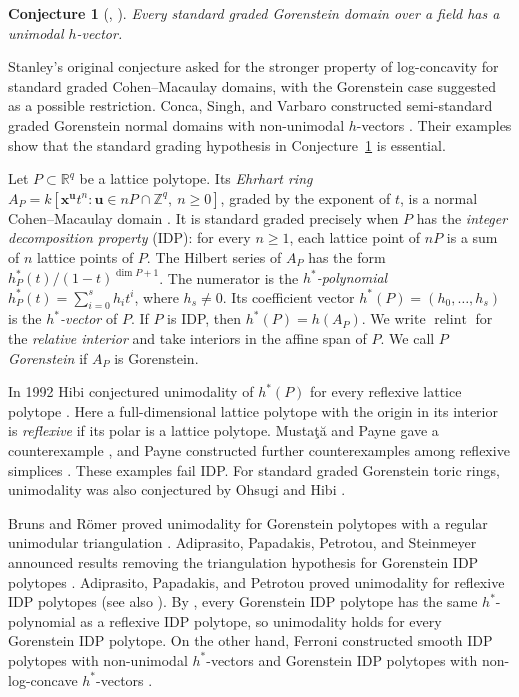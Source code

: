 \documentclass[a4paper,11pt]{amsart}
\DeclareMathOperator{\relint}{relint}
\newcommand{\kk}{k}
\newcommand{\ZZ}{\mathbb{Z}}
\newcommand{\RR}{\mathbb{R}}
\newtheorem{conjecture}[theorem]{Conjecture}
\theoremstyle{definition}
\begin{document}
\begin{conjecture}[{\cite[Conjecture~1.5]{H89}, \cite[Conjecture~4~(a), p.~512]{S89}}]\label{conj:classical}
Every standard graded Gorenstein domain over a field has a unimodal $h$-vector.
\end{conjecture}

Stanley's original conjecture asked for the stronger property of log-concavity for standard graded Cohen--Macaulay domains, with the Gorenstein case suggested as a possible restriction. Conca, Singh, and Varbaro constructed semi-standard graded Gorenstein normal domains with non-unimodal $h$-vectors \cite[Theorem~4.2]{CSV25}. Their examples show that the standard grading hypothesis in Conjecture~\ref{conj:classical} is essential.

Let $P\subset\RR^q$ be a lattice polytope. Its \emph{Ehrhart ring} $A_P=\kk[\mathbf{x}^{\boldsymbol u}t^n:\boldsymbol u\in nP\cap\ZZ^q,\ n\geq0]$, graded by the exponent of $t$, is a normal Cohen--Macaulay domain \cite[Theorem~1]{Hoc72}. It is standard graded precisely when $P$ has the \emph{integer decomposition property} (IDP): for every $n\geq1$, each lattice point of $nP$ is a sum of $n$ lattice points of $P$. The Hilbert series of $A_P$ has the form $h_P^*(t)/(1-t)^{\dim P+1}$. The numerator is the \emph{$h^*$-polynomial} $h_P^*(t)=\sum_{i=0}^s h_it^i$, where $h_s\ne0$. Its coefficient vector $h^*(P)=(h_0,\ldots,h_s)$ is the \emph{$h^*$-vector} of $P$. If $P$ is IDP, then $h^*(P)=h(A_P)$. We write $\relint$ for the \emph{relative interior} and take interiors in the affine span of $P$. We call $P$ \emph{Gorenstein} if $A_P$ is Gorenstein.

In 1992 Hibi conjectured unimodality of $h^*(P)$ for every reflexive lattice polytope \cite[p.~111]{H92}. Here a full-dimensional lattice polytope with the origin in its interior is \emph{reflexive} if its polar is a lattice polytope. Musta\c{t}\u{a} and Payne gave a counterexample \cite[Example~1.1]{MP05}, and Payne constructed further counterexamples among reflexive simplices \cite[Theorem~1.4]{P08}. These examples fail IDP. For standard graded Gorenstein toric rings, unimodality was also conjectured by Ohsugi and Hibi \cite[Introduction]{OH06}.

Bruns and R\"omer proved unimodality for Gorenstein polytopes with a regular unimodular triangulation \cite[Theorem~1]{BR07}. Adiprasito, Papadakis, Petrotou, and Steinmeyer announced results removing the triangulation hypothesis for Gorenstein IDP polytopes \cite{APPS22}. Adiprasito, Papadakis, and Petrotou proved unimodality for reflexive IDP polytopes \cite[Theorem~1.4]{APP25} (see also \cite[Corollary~6.3]{AKOPP26}). By \cite[Corollary~7]{BR07}, every Gorenstein IDP polytope has the same $h^*$-polynomial as a reflexive IDP polytope, so unimodality holds for every Gorenstein IDP polytope. On the other hand, Ferroni constructed smooth IDP polytopes with non-unimodal $h^*$-vectors and Gorenstein IDP polytopes with non-log-concave $h^*$-vectors \cite{F26}.
\end{document}
